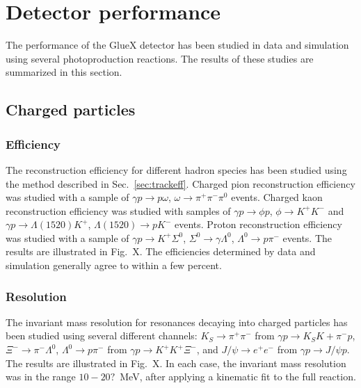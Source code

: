 
\section[Detector performance (Sean)]{Detector performance \label{sec:performance}}

The performance of the GlueX detector has been studied in data and simulation using several photoproduction reactions.  The results of these studies are summarized in this section.

\subsection{Charged particles \label{sec:perfcharged}}

\subsubsection{Efficiency \label{sec:perfchargedeff}}

The reconstruction efficiency for different hadron species has been studied using the method described in Sec.~\ref{sec:trackeff}.   Charged pion reconstruction efficiency was studied with a sample of $\gamma p \to p \omega$, $\omega \to \pi^+\pi^-\pi^0$ events.  Charged kaon reconstruction efficiency was studied with samples of $\gamma p \to \phi p$, $\phi \to K^+K^-$ and $\gamma p \to \Lambda(1520) K^+$, $\Lambda(1520) \to p K^-$ events.  Proton reconstruction efficiency was studied with a sample of $\gamma p \to K^+ \Sigma^0$, $\Sigma^0 \to \gamma \Lambda^0$, $\Lambda^0 \to p \pi^-$ events.  
The results are illustrated in Fig.~X. The efficiencies determined by data and simulation generally agree to within a few percent.

\subsubsection{Resolution \label{sec:perfchargedresol}}

The invariant mass resolution for resonances decaying into charged particles has been studied using several different channels:  $K_S\to\pi^+\pi^-$ from $\gamma p \to K_S K+ \pi^- p$, $\Xi^- \to \pi^- \Lambda^0$, $\Lambda^0 \to p \pi^-$ from $\gamma p \to K^+ K^+ \Xi^-$, and $J/\psi \to e^+ e^-$ from $\gamma p \to J/\psi p$.  The results are illustrated in Fig.~X.  In each case, the invariant mass resolution was in the range $10-20?$~MeV, after applying a kinematic fit to the full reaction.

